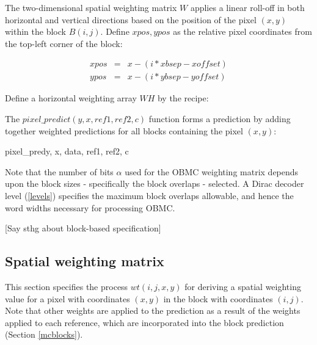 The two-dimensional spatial weighting matrix $W$ applies a linear roll-off in both horizontal and vertical directions
based on the position of the pixel $(x,y)$ within the block $B(i,j)$. Define $xpos, ypos$ as the relative
pixel coordinates from the top-left corner of the block:

\begin{eqnarray*}
xpos & = & x-(i*xbsep-xoffset) \\
ypos & = & x-(i*ybsep-yoffset) 
\end{eqnarray*}

Define a horizontal weighting array $WH$ by the recipe:

\providecommand{\abs}[1]{\left\lvert#1\right\rvert}
\begin{pseudo*}
\bsELSE
    \bsCODE{WH[xpos]  =  \clip(xblen-2\abs{xpos-\dfrac{(xblen-1)}{2}}, max\_x ) }
\bsEND
\end{pseudo*}The $pixel\_predict(y, x, ref1, ref2, c)$ function forms a prediction by adding together weighted predictions
for all blocks containing the pixel $(x,y)$:

\begin{pseudo}{pixel\_pred}{y, x, data, ref1, ref2, c}
\bsEND
{}
\end{pseudo}

\begin{informative}
Note that the number of bits $\alpha$ used for the OBMC weighting matrix depends upon the block sizes - specifically
the block overlaps - selected. A Dirac decoder level (\ref{levels}) specifies the maximum block overlaps allowable, and hence 
the word widths necessary for processing OBMC.

[Say sthg about block-based specification]
\end{informative}

\subsection{Spatial weighting matrix}

\label{mcspatialweights}

This section specifies the process $wt(i,j,x,y)$ for deriving a spatial weighting value for a pixel with
coordinates $(x,y)$ in the block with coordinates $(i,j)$. Note that other weights are applied
to the prediction as a result of the weights applied to each reference, which are incorporated
into the block prediction (Section \ref{mcblocks}).

